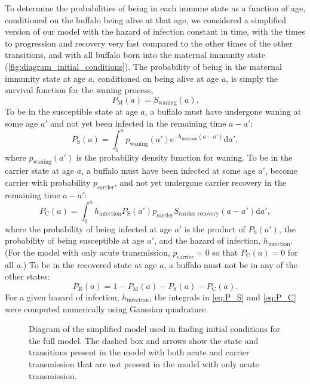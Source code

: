 \documentclass[12pt, USenglish]{article}  %
\newcommand{\md}{\mathrm{d}}
\newcommand{\me}{\mathrm{e}}
\begin{document}
To determine the probabilities of being in each immune state as a
function of age, conditioned on the buffalo being alive at that age, we
considered a simplified version of our model with the hazard of
infection constant in time, with the times to progression and recovery
very fast compared to the other times of the other transitions, and
with all buffalo born into the maternal immunity state
(\autoref{fig:diagram_initial_conditions}). The probability of being
in the maternal immunity state at age $a$, conditioned on being alive
at age $a$, is simply the survival function for the waning process,
\begin{equation}
  \label{eq:P_M}
  P_{\mathrm{M}}(a) = S_{\text{waning}}(a).
\end{equation}
To be in the susceptible state at age $a$, a buffalo must have
undergone waning at some age $a'$ and not yet been infected in the
remaining time $a - a'$:
\begin{equation}
  \label{eq:P_S}
  P_{\mathrm{S}}(a) =
  \int_0^a p_{\text{waning}}(a')
  \me^{- h_{\text{infection}} (a - a')} \md a',
\end{equation}
where $p_{\text{waning}}(a')$ is the probability density function for
waning. To be in the carrier state at age $a$, a buffalo must have
been infected at some age $a'$, become carrier with probability
$p_{\text{carrier}}$, and not yet undergone carrier recovery in the
remaining time $a - a'$:
\begin{equation}
  \label{eq:P_C}
  P_{\mathrm{C}}(a) =
  \int_0^a h_{\text{infection}} P_{\mathrm{S}}(a')
  p_{\text{carrier}}
  S_{\text{carrier recovery}}(a - a') \md a',
\end{equation}
where the probability of being infected at age $a'$ is the product of
$P_{\mathrm{S}}(a')$, the probability of being susceptible at age
$a'$, and the hazard of infection, $h_{\text{infection}}$.
(For the model with only acute transmission, $p_{\text{carrier}} = 0$
so that $P_{\mathrm{C}}(a) = 0$ for all $a$.)
To be in the recovered state at age $a$, a buffalo must not be in any
of the other states:
\begin{equation}
  P_{\mathrm{R}}(a) = 1 - P_{\mathrm{M}}(a)
  - P_{\mathrm{S}}(a) - P_{\mathrm{C}}(a).
\end{equation}
For a given hazard of infection, $h_{\text{infection}}$, the
integrals in \eqref{eq:P_S} and \eqref{eq:P_C} were computed
numerically using Gaussian quadrature.

\begin{figure}
  \centering
  \textsf{}
  \caption{Diagram of the simplified model used in finding initial
    conditions for the full model. The dashed box and arrows show the
    state and transitions present in the model with both acute and
    carrier transmission that are not present in the model with only
    acute transmission.}
  \label{fig:diagram_initial_conditions}
\end{figure}
\end{document}

